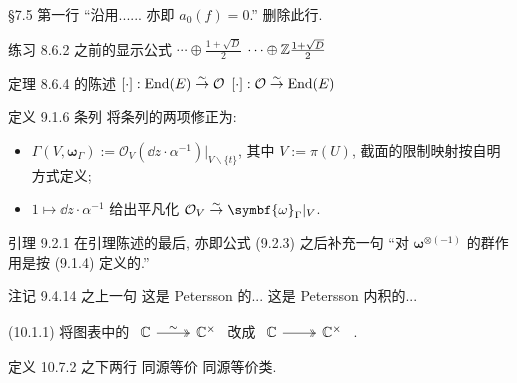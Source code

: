 \documentclass{AJerrata}
\newcommand{\bomega}{\symbf{\omega}}	%
\begin{document}
\begin{Errata}
		\item[\S 7.5 第一行 ``沿用...... 亦即 $a_0(f)=0$.'']
		删除此行.
		
		\item[练习 8.6.2 之前的显示公式]
		\Orig $\cdots \oplus \frac{1 + \sqrt{D}}{2}$
		\Corr $\cdots \oplus \mathbb{Z} \frac{1 + \sqrt{D}}{2}$
		
		\item[定理 8.6.4 的陈述]
		\Orig $[\cdot]: \operatorname{End}(E) \stackrel{\sim}{\rightarrow} \mathcal{O}$
		\Corr $[\cdot]: \mathcal{O} \stackrel{\sim}{\rightarrow} \operatorname{End}(E)$
		
		\item[定义 9.1.6 条列]
		将条列的两项修正为:
		\begin{itemize}
			\item $\Gamma(V, \bomega_\Gamma) := \mathcal{O}_V (\dd z \cdot \alpha^{-1}) |_{V \smallsetminus \{t\}}$, 其中 $V := \pi(U)$, 截面的限制映射按自明方式定义;
			\item $1 \mapsto \dd z \cdot \alpha^{-1}$ 给出平凡化 $\mathcal{O}_V \rightiso \bomega_\Gamma |_V$.
		\end{itemize}
		
		\item[引理 9.2.1]
		在引理陈述的最后, 亦即公式 (9.2.3) 之后补充一句 ``对 $\bomega^{\otimes (-1)}$ 的群作用是按 (9.1.4) 定义的.''

		\item[注记 9.4.14 之上一句]
		\Orig 这是 Petersson 的...
		\Corr 这是 Petersson 内积的...
		
		\item[(10.1.1)] 将图表中的
		$\begin{tikzcd} \mathbb{C} \arrow[twoheadrightarrow, r, "\sim"] & \mathbb{C}^\times \end{tikzcd}$
		改成
		$\begin{tikzcd} \mathbb{C} \arrow[twoheadrightarrow, r] & \mathbb{C}^\times \end{tikzcd}$ .
		
		\item[定义 10.7.2 之下两行]
		\Orig 同源等价
		\Corr 同源等价类.
	\end{Errata}
\end{document}
